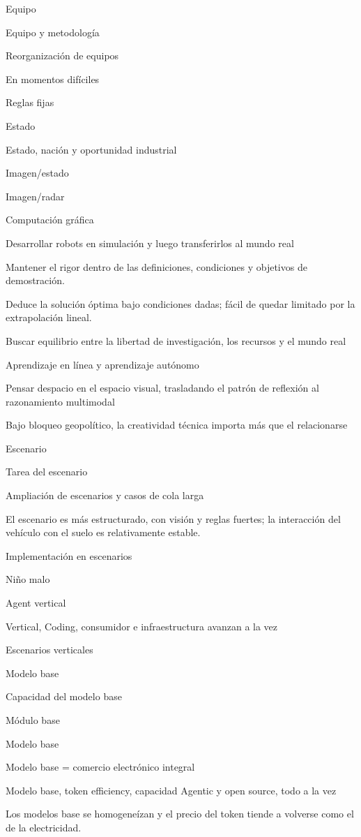 \documentclass{article}
\begin{document}
Equipo

Equipo y metodología

Reorganización de equipos

En momentos difíciles

Reglas fijas

Estado

Estado, nación y oportunidad industrial

Imagen/estado

Imagen/radar

Computación gráfica

Desarrollar robots en simulación y luego transferirlos al mundo real

Mantener el rigor dentro de las definiciones, condiciones y objetivos de demostración.

Deduce la solución óptima bajo condiciones dadas; fácil de quedar limitado por la extrapolación lineal.

Buscar equilibrio entre la libertad de investigación, los recursos y el mundo real

Aprendizaje en línea y aprendizaje autónomo

Pensar despacio en el espacio visual, trasladando el patrón de reflexión al razonamiento multimodal

Bajo bloqueo geopolítico, la creatividad técnica importa más que el relacionarse

Escenario

Tarea del escenario

Ampliación de escenarios y casos de cola larga

El escenario es más estructurado, con visión y reglas fuertes; la interacción del vehículo con el suelo es relativamente estable.

Implementación en escenarios

Niño malo

Agent vertical

Vertical, Coding, consumidor e infraestructura avanzan a la vez

Escenarios verticales

Modelo base

Capacidad del modelo base

Módulo base

Modelo base

Modelo base = comercio electrónico integral

Modelo base, token efficiency, capacidad Agentic y open source, todo a la vez

Los modelos base se homogeneízan y el precio del token tiende a volverse como el de la electricidad.
\end{document}
